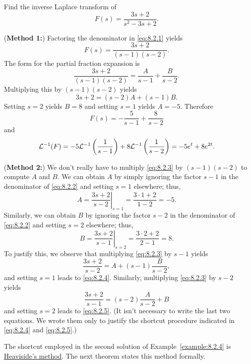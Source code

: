 \documentclass{ximera}
\begin{document}
\begin{example}\label{example:8.2.4} Find the inverse Laplace transform
of
\begin{equation}\label{eq:8.2.1}
F(s)=\frac{3s+2}{s^2-3s+2}.
\end{equation}
\begin{explanation}
({\bf Method 1:})
 Factoring the denominator in  \eqref{eq:8.2.1} yields
\begin{equation}\label{eq:8.2.2}
F(s)=\frac{3s+2}{(s-1)(s-2)}.
\end{equation}
The form for the partial fraction expansion is
\begin{equation}\label{eq:8.2.3}
\frac{3s+2}{(s-1)(s-2)}=\frac{A}{s-1}+\frac{B}{s-2}.
\end{equation}
Multiplying  this by $(s-1)(s-2)$ yields
$$
3s+2=(s-2)A+(s-1)B.
$$
Setting $s=2$ yields $B=8$ and setting $s=1$ yields $A=-5$. Therefore
$$
F(s)=-\frac{5}{s-1}+\frac{8}{s-2}
$$
and
$$
{\cal L}^{-1}(F)=-5{\cal L}^{-1}\left(\frac{1}{s-1}\right)
+8{\cal L}^{-1}\left(\frac{1}{s-2}\right)=-5e^t+8e^{2t}.
$$
\end{explanation}
\begin{explanation}
({\bf Method 2:})
We don't really have to multiply  \eqref{eq:8.2.3} by $(s-1)(s-2)$
to compute $A$ and $B$. We can obtain $A$ by simply ignoring the factor
$s-1$ in the denominator of  \eqref{eq:8.2.2} and setting $s=1$ elsewhere;
thus,
\begin{equation}\label{eq:8.2.4}
A=\left.\frac{3s+2}{s-2}\right|_{s=1}=\frac{3\cdot1+2}{ 1-2}=-5.
\end{equation}
Similarly, we can obtain $B$ by ignoring the factor
$s-2$ in the denominator of  \eqref{eq:8.2.2} and setting $s=2$ elsewhere;
thus,
\begin{equation}\label{eq:8.2.5}
B=\left.\frac{3s+2}{s-1}\right|_{s=2}=\frac{3\cdot2+2}{2-1}=8.
\end{equation}
To justify this, we observe that multiplying  \eqref{eq:8.2.3} by $s-1$
yields
$$
\frac{3s+2}{s-2}=A+(s-1)\frac{B}{s-2},
$$
and setting $s=1$ leads to
\eqref{eq:8.2.4}. Similarly, multiplying  \eqref{eq:8.2.3} by $s-2$ yields
$$
\frac{3s+2}{s-1}=(s-2)\frac{A}{s-2}+B
$$
and setting $s=2$ leads to
\eqref{eq:8.2.5}.  (It isn't necessary to
 write the last two equations. We wrote them only to justify
the shortcut procedure indicated in  \eqref{eq:8.2.4} and
\eqref{eq:8.2.5}.)
\end{explanation}
\end{example}

The shortcut employed in the second solution of
Example~\ref{example:8.2.4} is
\href{http://www-history.mcs.st-and.ac.uk/Mathematicians/Heaviside.html}{Heaviside's method}.
The next theorem states this method formally. 
\end{document}
